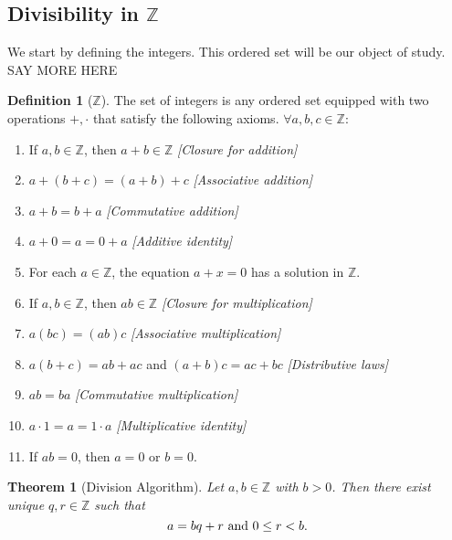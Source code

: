 \documentclass{article}
\newtheorem{theorem}{Theorem}[section]
\theoremstyle{definition}
\newtheorem{definition}{Definition}[section]
\theoremstyle{remark}
\begin{document}
\subsection{Divisibility in $\mathbb{Z}$}

We start by defining the integers. This ordered set will be our object of study. SAY MORE HERE

\begin{definition}[$\mathbb{Z}$]
The set of integers is any ordered set equipped with two operations $+, \cdot$ that satisfy the following axioms. $\forall a,b,c \in \mathbb{Z}:$
\begin{enumerate}
\item If $a, b \in \mathbb{Z}$, then $a + b \in \mathbb{Z}$ \hfill \textit{[Closure for addition]}
\item $a + (b + c) = (a + b) + c$ \hfill \textit{[Associative addition]}
\item $a + b = b + a$ \hfill \textit{[Commutative addition]}
\item $a + 0 = a = 0 + a$ \hfill \textit{[Additive identity]}
\item For each $a \in \mathbb{Z}$, the equation $a + x = 0$ has a solution in $\mathbb{Z}$.
\item If $a, b \in \mathbb{Z}$, then $ab \in \mathbb{Z}$ \hfill \textit{[Closure for multiplication]}
\item $a(bc) = (ab)c$ \hfill \textit{[Associative multiplication]}
\item $a(b + c) = ab + ac$ and \newline
\hspace{0.5cm} $(a + b)c = ac + bc$ \hfill \textit{[Distributive laws]}
\item $ab = ba$ \hfill \textit{[Commutative multiplication]}
\item $a \cdot 1 = a = 1 \cdot a$ \hfill \textit{[Multiplicative identity]}
\item If $ab = 0$, then $a = 0$ or $b = 0$.








\end{enumerate}

\end{definition}







\begin{theorem}[Division Algorithm]\label{thm:division_algorithim}
Let \(a,b \in \mathbb{Z}\) with \(b>0\). Then there exist unique \(q,r \in \mathbb{Z}\) such that \[
a = bq+r \textnormal{ and } 0 \leq r < b.
\]
\end{theorem}
\end{document}
